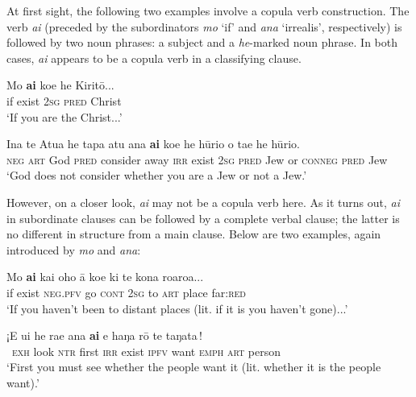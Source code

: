 At first sight, the following two examples involve a copula verb construction. The verb \textit{ai} (preceded by the subordinators \textit{mo} ‘if’ and \textit{ana} ‘irrealis’, respectively) is followed by two noun phrases: a subject and a \textit{he}-marked noun phrase. In both cases, \textit{ai} appears to be a copula verb in a classifying clause.

\ea\label{ex:9.97}
\gll Mo \textbf{ai} koe he Kiritō... \\
if exist \textsc{2sg} \textsc{pred} Christ \\

\glt 
‘If you are the Christ...’ \textstyleExampleref{[Mat. 26:63]}
\z

\ea\label{ex:9.98}
\gll {\ꞌ}Ina te {\ꞌ}Atua he tapa atu ana \textbf{ai} koe he hūrio {\ꞌ}o ta{\ꞌ}e he hūrio. \\
\textsc{neg} \textsc{art} God \textsc{pred} consider away \textsc{irr} exist \textsc{2sg} \textsc{pred} Jew or \textsc{conneg} \textsc{pred} Jew \\

\glt
‘God does not consider whether you are a Jew or not a Jew.’ 
\z

However, on a closer look, \textit{ai} may not be a copula verb here. As it turns out, \textit{ai} in subordinate clauses can be followed by a complete verbal clause; the latter is no different in structure from a main clause. Below are two examples, again introduced by \textit{mo} and \textit{ana}:

\ea\label{ex:9.99}
\gll Mo \textbf{ai} {\ob}kai oho {\ꞌ}ā koe ki te kona roaroa...\,{\cb} \\
if exist {\db}\textsc{neg.pfv} go \textsc{cont} \textsc{2sg} to \textsc{art} place far:\textsc{red} \\

\glt 
‘If you haven’t been to distant places (lit. if it is you haven’t gone)...’ \textstyleExampleref{[R615.519]} 
\z

\ea\label{ex:9.100}
\gll ¡E u{\ꞌ}i he ra{\ꞌ}e ana \textbf{ai} {\ob}e haŋa rō te taŋata\,{\cb}! \\
~\textsc{exh} look \textsc{ntr} first \textsc{irr} exist {\db}\textsc{ipfv} want \textsc{emph} \textsc{art} person \\

\glt
‘First you must see whether the people want it (lit. whether it is the people want).’ \textstyleExampleref{[R647.248]} 
\z

